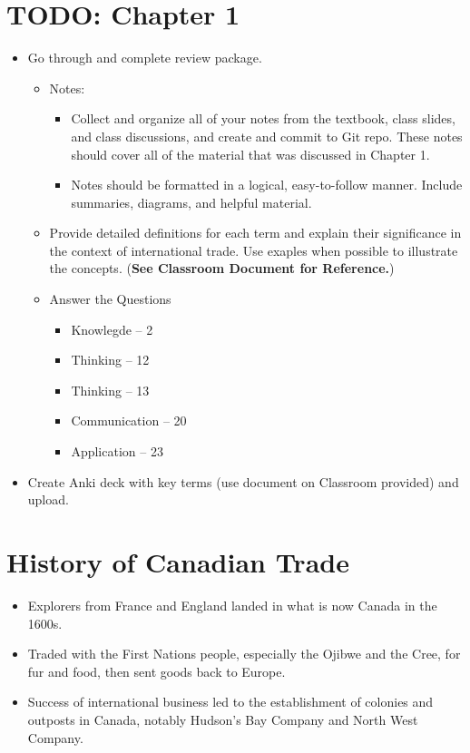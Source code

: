 
\section{TODO: Chapter 1}
\begin{itemize}
    \item Go through and complete review package.
    \begin{itemize}
        \item Notes:
        \begin{itemize}
            \item Collect and organize all of your notes from the textbook, class slides, and class discussions, and create and commit to Git repo. These notes should cover all of the material that was discussed in Chapter 1.
            \item Notes should be formatted in a logical, easy-to-follow manner. Include summaries, diagrams, and helpful material.
        \end{itemize}
        \item Provide detailed definitions for each term and explain their significance in the context of international trade. Use exaples when possible to illustrate the concepts. (\textbf{See Classroom Document for Reference.})
        \item Answer the Questions
        \begin{itemize}
            \item Knowlegde -- 2
            \item Thinking -- 12
            \item Thinking -- 13
            \item Communication -- 20
            \item Application -- 23
        \end{itemize}
    \end{itemize}
    \item Create Anki deck with key terms (use document on Classroom provided) and upload.
\end{itemize}

\section{History of Canadian Trade}

\begin{itemize}
    \item Explorers from France and England landed in what is now Canada in the 1600s.
    \item Traded with the First Nations people, especially the Ojibwe and the Cree, for fur and food, then sent goods back to Europe.
    \item Success of international business led to the establishment of colonies and outposts in Canada, notably Hudson's Bay Company and North West Company.
\end{itemize}

